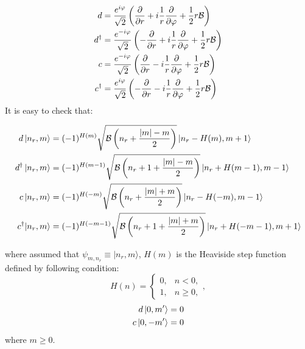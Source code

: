 \documentclass[a4paper,article,14pt]{extarticle}
\begin{document}
\begin{equation}
\begin{aligned}
d &= \frac{e^{i \varphi}} {\sqrt{2}} \left(  \frac {\partial }{\partial r} + i \frac{1}{r}  \frac {\partial }{\partial \varphi} + \frac 1 2   r \cal B  \right) \\
d^{\dagger} &= \frac{e^{ -i \varphi}} {\sqrt{2}} \left(  - \frac {\partial }{\partial r} + i \frac{1}{r}  \frac {\partial }{\partial \varphi} + \frac 1 2    r \cal B \right) \\
c &= \frac{e^{- i \varphi}} {\sqrt{2}} \left(  \frac {\partial }{\partial r} - i \frac{1}{r}  \frac {\partial }{\partial \varphi} + \frac 1 2   r \cal B  \right) \\
c^{\dagger} &= \frac{e^{ i \varphi}} {\sqrt{2}} \left(  - \frac {\partial }{\partial r} - i \frac{1}{r}  \frac {\partial }{\partial \varphi} + \frac 1 2    r \cal B \right) \\
\end{aligned}
\end{equation}
It is easy to check that:

\begin{equation}
\begin{aligned}
d \ket{n_r,m} &= (-1)^{H(m)} \sqrt{ {\cal{B}} \left(n_r + \frac{|m| - m}{2} \right)}  \ket{n_r-H(m), m+1}  \\
d^{\dagger}  \ket{n_r,m} &= (-1)^{H(m-1)} \sqrt{ {\cal{B}} \left(n_r + 1 + \frac{|m| - m}{2} \right)}  \ket{n_r+H(m-1), m-1}  \\
c \ket{n_r,m} &= (-1)^{H(-m)} \sqrt{ {\cal{B}} \left(n_r + \frac{|m| + m}{2} \right)}  \ket{n_r-H(-m), m-1}  \\
c^{\dagger} |n_r,m\rangle &= (-1)^{H(-m-1)} \sqrt{ {\cal{B}} \left( n_r + 1 + \frac{|m| + m}{2}\right)}   \ket{n_r+H(-m-1),m+1 }
\end{aligned}
\end{equation}


\noindent where assumed that $\psi_{m, n_r} \equiv |n_r,m\rangle$, $H(m)$ is the Heaviside step function defined by following condition:
$$
H(n)=\begin{cases} 0, & n < 0, \\ 1, & n \ge 0, \end{cases},
$$
\begin{equation}
\begin{aligned}
d \ket{0, m'} &= 0 \\
c \ket{0, -m'} &= 0 \\
\end{aligned}
\end{equation}
\noindent where $m \ge 0$.
\end{document}
